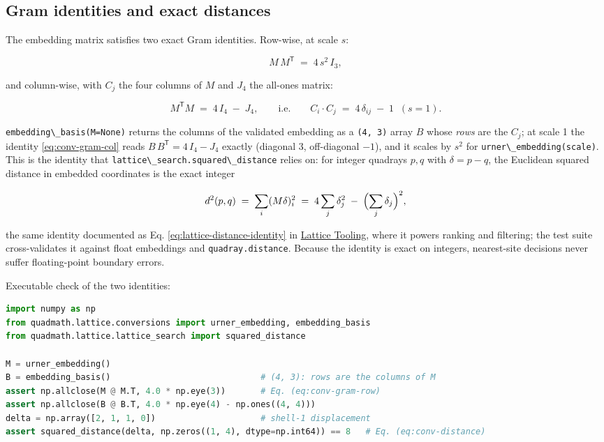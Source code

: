 \documentclass[
  10pt,
]{article}
\newcommand{\passthrough}[1]{#1}
\begin{document}
\subsection{Gram identities and exact
distances}\label{gram-identities-and-exact-distances}

The embedding matrix satisfies two exact Gram identities. Row-wise, at
scale \(s\):

\begin{equation}
\label{eq:conv-gram-row}
M\,M^{\mathsf{T}} \;=\; 4\,s^{2}\,I_{3},
\end{equation}

and column-wise, with \(C_j\) the four columns of \(M\) and \(J_4\) the
all-ones matrix:

\begin{equation}
\label{eq:conv-gram-col}
M^{\mathsf{T}}M \;=\; 4\,I_{4} \;-\; J_{4},
\qquad \text{i.e.} \qquad
C_i \cdot C_j \;=\; 4\,\delta_{ij} \;-\; 1 \;\; (s = 1).
\end{equation}

\passthrough{\lstinline!embedding\_basis(M=None)!} returns the columns
of the validated embedding as a \passthrough{\lstinline!(4, 3)!} array
\(B\) whose \emph{rows} are the \(C_j\); at scale 1 the identity
\eqref{eq:conv-gram-col} reads \(B\,B^{\mathsf{T}} = 4\,I_4 - J_4\)
exactly (diagonal 3, off-diagonal \(-1\)), and it scales by \(s^2\) for
\passthrough{\lstinline!urner\_embedding(scale)!}. This is the identity
that \passthrough{\lstinline!lattice\_search.squared\_distance!} relies
on: for integer quadrays \(p, q\) with \(\delta = p - q\), the Euclidean
squared distance in embedded coordinates is the exact integer

\begin{equation}
\label{eq:conv-distance}
d^{2}(p, q) \;=\; \sum_{i} (M\delta)_i^{2}
\;=\; 4 \sum_{j} \delta_j^{2} \;-\; \Bigl(\sum_{j} \delta_j\Bigr)^{2},
\end{equation}

the same identity documented as Eq. \eqref{eq:lattice-distance-identity}
in \href{13_lattice_tooling.md}{Lattice Tooling}, where it powers
ranking and filtering; the test suite cross-validates it against float
embeddings and \passthrough{\lstinline!quadray.distance!}. Because the
identity is exact on integers, nearest-site decisions never suffer
floating-point boundary errors.

Executable check of the two identities:

\begin{lstlisting}[language=Python]
import numpy as np
from quadmath.lattice.conversions import urner_embedding, embedding_basis
from quadmath.lattice.lattice_search import squared_distance

M = urner_embedding()
B = embedding_basis()                              # (4, 3): rows are the columns of M
assert np.allclose(M @ M.T, 4.0 * np.eye(3))       # Eq. (eq:conv-gram-row)
assert np.allclose(B @ B.T, 4.0 * np.eye(4) - np.ones((4, 4)))
delta = np.array([2, 1, 1, 0])                     # shell-1 displacement
assert squared_distance(delta, np.zeros((1, 4), dtype=np.int64)) == 8   # Eq. (eq:conv-distance)
\end{lstlisting}
\end{document}
